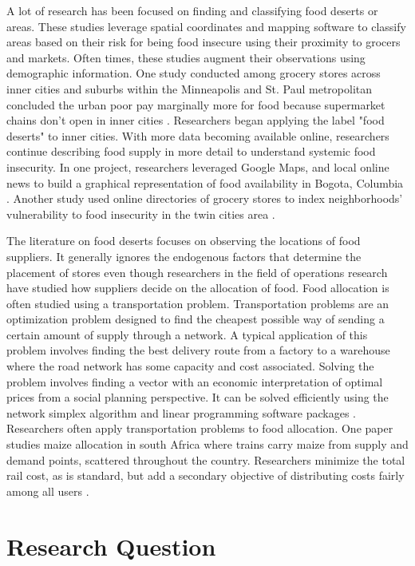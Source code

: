 \documentclass{report}
\begin{document}
A lot of research has been focused on finding and classifying food deserts or areas. These studies leverage spatial coordinates and mapping software to classify areas based on their risk for being food insecure using their proximity to grocers and markets. Often times, these studies augment their observations using demographic information.  One study conducted among grocery stores across inner cities and suburbs within the Minneapolis and St. Paul metropolitan concluded the urban poor pay marginally more for food because supermarket chains don't open in inner cities \cite{Chung}. Researchers began applying the label "food deserts" to inner cities. With more data becoming available online, researchers continue describing food supply in more detail to understand systemic food insecurity. In one project, researchers leveraged Google Maps, and local online news to build a graphical representation of food availability in Bogota, Columbia \cite{Hwang}. Another study used online directories of grocery stores to index neighborhoods' vulnerability to food insecurity in the twin cities area \cite{Larson}.

The literature on food deserts focuses on observing the locations of food suppliers. It generally ignores the endogenous factors that determine the placement of stores even though researchers in the field of operations research have studied how suppliers decide on the allocation of food. Food allocation is often studied using a transportation problem. Transportation problems are an optimization problem designed to find the cheapest possible way of sending a certain amount of supply through a network. A typical application of this problem involves finding the best delivery route from a factory to a warehouse where the road network has some capacity and cost associated. Solving the problem involves finding a vector with an economic interpretation of optimal prices from a social planning perspective. It can be solved efficiently using the network simplex algorithm and linear programming software packages \cite{Cook}. Researchers often apply transportation problems to food allocation. One paper studies maize allocation in south Africa where trains carry maize from supply and demand points, scattered throughout the country. Researchers minimize the total rail cost, as is standard, but add a secondary objective of distributing costs fairly among all users \cite{Stewart}.

\section{Research Question} 
\end{document}
